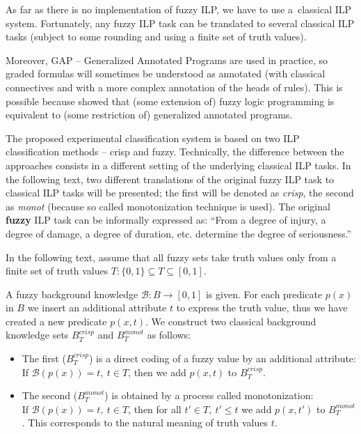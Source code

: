 As far as there is no implementation of fuzzy ILP, we have to use a~classical ILP system. Fortunately, any fuzzy ILP task can be translated to several classical ILP tasks (subject to some rounding and using a finite set of truth values).

Moreover, GAP -- Generalized Annotated Programs \citep{Kifer:1992:TGA:139720.139723} are used in practice, so graded formulas will sometimes be understood as annotated (with classical connectives and with a more complex annotation of the heads of rules). This is possible because \cite{biblio:KLV} showed that (some extension of) fuzzy logic programming is equivalent to (some restriction of) generalized annotated programs. 

The proposed experimental classification system is based on two ILP classification methods -- crisp and fuzzy. 
Technically, the difference between the approaches consists in a different setting of the underlying classical ILP tasks. 
In the following text, two different translations of the original fuzzy ILP task to classical ILP tasks will be presented; the first will be denoted as \emph{crisp}, the second as \emph{monot} (because so called monotonization technique is used). The original \textbf{fuzzy} ILP task can be informally expressed as: ``From a degree of injury, a degree of damage, a degree of duration, etc. determine the degree of seriousness.''   

\bigskip
In the following text, assume that all fuzzy sets take truth values only from a finite set of truth values $T: \{0,1\}\subseteq T\subseteq [0,1]$.

\begin{definition}
A fuzzy background knowledge ${\mathcal B}:B\longrightarrow [0,1]$ is given. For each predicate $p(x)$ in $B$ we insert an additional attribute $t$ to express the truth value, thus we have created a new predicate $p(x,t)$. We construct two classical background knowledge sets $B^{crisp}_T$ and $B^{monot}_T$  as follows:

\begin{itemize}
	\item The first ($B^{crisp}_T$) is a direct coding of a fuzzy value by an additional attribute:
\\If ${\mathcal B}(p(x))=t,\  t \in T$, then we add $p(x,t)$ to  ${B}^{crisp}_T$.
	\item The second ($B^{monot}_T$) is obtained by a process called monotonization:
\\If ${\mathcal B}(p(x))=t,\  t \in T$, then for all $t'\in T,\  t'\le t$ we add $p(x,t')$ to ${B}^{monot}_T$.
This corresponds to the natural meaning of truth values $t$.
\end{itemize}
\end{definition}



